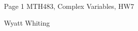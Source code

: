 \documentclass{article}
\begin{document}
\large %


{\Large Page 1 %
\hfill  MTH483, Complex Variables, HW7}

\begin{center}
{\Large Wyatt Whiting}
\end{center}
\vspace{0.05in}

\end{document}
